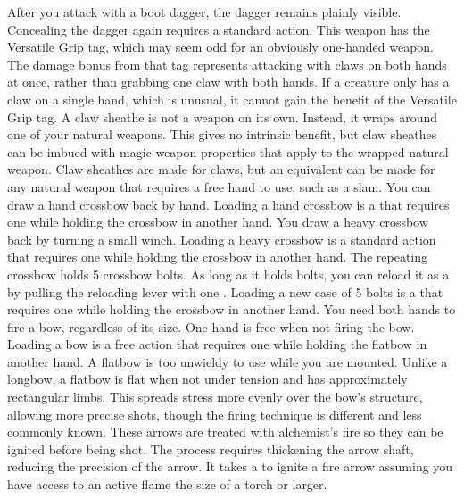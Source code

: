         After you attack with a boot dagger, the dagger remains plainly visible.
        Concealing the dagger again requires a standard action.
         This weapon has the Versatile Grip tag, which may seem odd for an obviously one-handed weapon.
        The damage bonus from that tag represents attacking with claws on both hands at once, rather than grabbing one claw with both hands.
        If a creature only has a claw on a single hand, which is unusual, it cannot gain the benefit of the Versatile Grip tag.
         A claw sheathe is not a weapon on its own.
        Instead, it wraps around one of your natural weapons.
        This gives no intrinsic benefit, but claw sheathes can be imbued with magic weapon properties that apply to the wrapped natural weapon.
        Claw sheathes are made for claws, but an equivalent can be made for any natural weapon that requires a free hand to use, such as a slam.
         You can draw a hand crossbow back by hand. Loading a hand crossbow is a  that requires one  while holding the crossbow in another hand.
         You draw a heavy crossbow back by turning a small winch.
        Loading a heavy crossbow is a standard action that requires one  while holding the crossbow in another hand.
         The repeating crossbow holds 5 crossbow bolts. As long as it holds bolts, you can reload it as a  by pulling the reloading lever with one . Loading a new case of 5 bolts is a  that requires one  while holding the crossbow in another hand.
         You need both hands to fire a bow, regardless of its size. One hand is free when not firing the bow. Loading a bow is a free action that requires one  while holding the flatbow in another hand. A flatbow is too unwieldy to use while you are mounted.
        Unlike a longbow, a flatbow is flat when not under tension and has approximately rectangular limbs.
        This spreads stress more evenly over the bow's structure, allowing more precise shots, though the firing technique is different and less commonly known.
         These arrows are treated with alchemist's fire so they can be ignited before being shot.
        The process requires thickening the arrow shaft, reducing the precision of the arrow.
        It takes a  to ignite a fire arrow assuming you have access to an active flame the size of a torch or larger.
